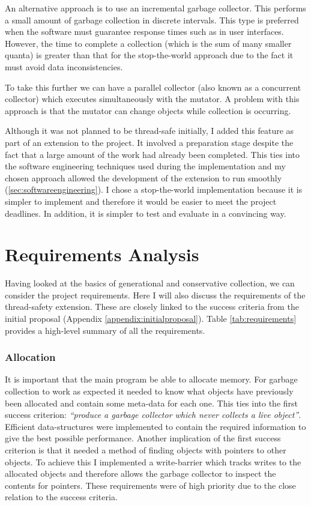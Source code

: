 \documentclass[../diss.tex]{subfiles}
\begin{document}
An alternative approach is to use an incremental garbage collector. This performs a small amount of garbage collection in discrete intervals. This type is preferred when the software must guarantee response times such as in user interfaces. However, the time to complete a collection (which is the sum of many smaller quanta) is greater than that for the stop-the-world approach due to the fact it must avoid data inconsistencies. 

To take this further we can have a parallel collector (also known as a concurrent collector) which executes simultaneously with the mutator. A problem with this approach is that the mutator can change objects while collection is occurring.

Although it was not planned to be thread-safe initially, I added this feature as part of an extension to the project. It involved a preparation stage despite the fact that a large amount of the work had already been completed. This ties into the software engineering techniques used during the implementation and my chosen approach allowed the development of the extension to run smoothly (\cref{sec:softwareengineering}). I chose a stop-the-world implementation because it is simpler to implement and therefore it would be easier to meet the project deadlines. In addition, it is simpler to test and evaluate in a convincing way.

\section{Requirements Analysis} \label{sec:requirements}

Having looked at the basics of generational and conservative collection, we can consider the project requirements. Here I will also discuss the requirements of the thread-safety extension. These are closely linked to the success criteria from the initial proposal (Appendix \ref{appendix:initialproposal}). Table \ref{tab:requirements} provides a high-level summary of all the requirements.

\subsubsection{Allocation}

It is important that the main program be able to allocate memory. For garbage collection to work as expected it needed to know what objects have previously been allocated and contain some meta-data for each one. This ties into the first success criterion: \emph{``produce a garbage collector which never collects a live object''}. Efficient data-structures were implemented to contain the required information to give the best possible performance. Another implication of the first success criterion is that it needed a method of finding objects with pointers to other objects. To achieve this I implemented a write-barrier which tracks writes to the allocated objects and therefore allows the garbage collector to inspect the contents for pointers. These requirements were of high priority due to the close relation to the success criteria.
\end{document}
